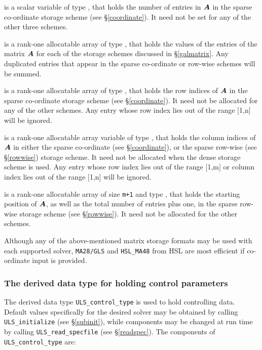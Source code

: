 \documentclass{galahad}
\newcommand{\packagename}{ULS}
\begin{document}
\begin{description}
 is a scalar variable of type \integer, that
holds the number of entries in ${\bm{A}}$
in the sparse co-ordinate storage scheme (see \S\ref{coordinate}).
It need not be set for any of the other three schemes.

 is a rank-one allocatable array of type \realdp, that holds
the values of the entries of the matrix ${\bm{A}}$ for each of the
storage schemes discussed in \S\ref{galmatrix}.
Any duplicated entries that appear in the sparse
co-ordinate or row-wise schemes will be summed.

 is a rank-one allocatable array of type \integer,
that holds the row indices of ${\bm{A}}$ in the sparse co-ordinate storage
scheme (see \S\ref{coordinate}).
It need not be allocated for any of the other schemes.
Any entry whose row index lies out of the range $[$1,n$]$ will be ignored.

 is a rank-one allocatable array variable of type \integer,
that holds the column indices of ${\bm{A}}$ in either the sparse co-ordinate
(see \S\ref{coordinate}), or the sparse row-wise
(see \S\ref{rowwise}) storage scheme.
It need not be allocated when the dense
storage scheme is used.
Any entry whose row index lies out of the range $[$1,m$]$ or
column index lies out of the range $[$1,n$]$ will be ignored.

 is a rank-one allocatable array of size {\tt m+1} and type
\integer, that holds the starting position of ${\bm{A}}$, as well
as the total number of entries plus one, in the sparse row-wise storage
scheme (see \S\ref{rowwise}). It need not be allocated for the
other schemes.

\end{description}
Although any of the above-mentioned matrix storage formats may be used
with each supported solver, {\tt MA28/GLS} and {\tt HSL\_MA48}
from HSL are most efficient if co-ordinate input is provided.


\subsubsection{The derived data type for holding control
 parameters}\label{typecontrol}
The derived data type
{\tt \packagename\_control\_type}
is used to hold controlling data.
Default values specifically for the desired solver
may be obtained by calling
{\tt \packagename\_initialize}
(see \S\ref{subinit}),
while components may be changed at run time by calling
{\tt \packagename\_read\-\_specfile}
(see \S\ref{readspec}).
The components of
{\tt \packagename\_control\_type}
are:
\end{document}
